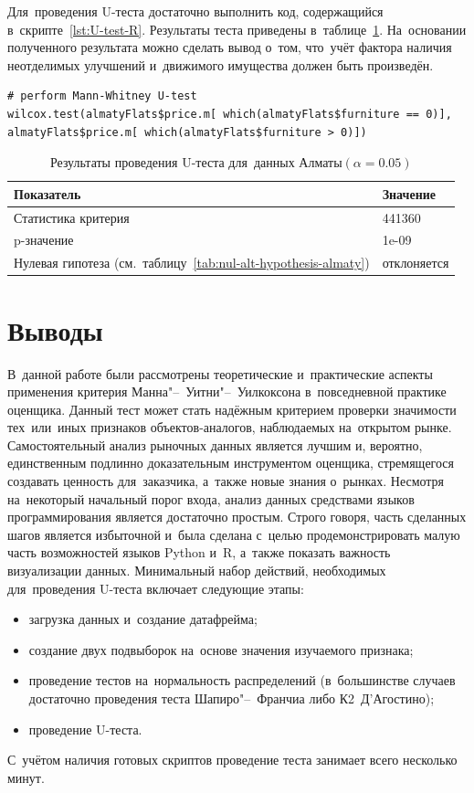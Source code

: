 \documentclass[]{scrreprt}
\begin{document}
Для~проведения U-теста достаточно выполнить код, содержащийся в~скрипте~\ref{lst:U-test-R}. Результаты теста приведены в~таблице~\ref{tab:u-test-r-result}. На~основании полученного результата можно сделать вывод о~том, что~учёт фактора наличия неотделимых улучшений и~движимого имущества должен быть произведён.
%
\begin{lstlisting}[float, caption = Проведение U-теста для данных города Алматы, firstnumber=1, label= lst:U-test-R]
# perform Mann-Whitney U-test
wilcox.test(almatyFlats$price.m[ which(almatyFlats$furniture == 0)],
almatyFlats$price.m[ which(almatyFlats$furniture > 0)]) 
\end{lstlisting}
%
\begin{table}[ht]
	\caption{Результаты проведения U-теста для~данных Алматы$({\textstyle \alpha=0.05})$}\label{tab:u-test-r-result}
	\centering
	\begin{tabular}{ll}
		\hline
		Показатель&Значение\\
		\hline
		Статистика критерия&441360\\
		\hline
		p-значение&1e-09\\
		\hline
		Нулевая гипотеза (см.~таблицу~\ref{tab:nul-alt-hypothesis-almaty})&отклоняется\\
		\hline
	\end{tabular}
\end{table}
%

\clearpage

\chapter{Выводы}
В~данной работе были рассмотрены теоретические и~практические аспекты применения критерия Манна"--~Уитни"--~Уилкоксона в~повседневной практике оценщика. Данный тест может стать надёжным критерием проверки значимости тех~или~иных признаков объектов-аналогов, наблюдаемых на~открытом рынке. Самостоятельный анализ рыночных данных является лучшим и, вероятно, единственным подлинно доказательным инструментом оценщика, стремящегося создавать ценность для~заказчика, а~также новые знания о~рынках. Несмотря на~некоторый начальный порог входа, анализ данных средствами языков программирования является достаточно простым. Строго говоря, часть сделанных шагов является избыточной и~была сделана с~целью продемонстрировать малую часть возможностей языков Python и~R, а~также показать важность визуализации данных. Минимальный набор действий, необходимых для~проведения U-теста включает следующие этапы:
\begin{itemize}
	\item загрузка данных и~создание датафрейма;
	\item создание двух подвыборок на~основе значения изучаемого признака;
	\item проведение тестов на~нормальность распределений (в~большинстве случаев достаточно проведения теста Шапиро"--~Франчиа либо К2~Д'Агостино);
	\item проведение U-теста.
\end{itemize}
С~учётом наличия готовых скриптов проведение теста занимает всего несколько минут.
\end{document}
